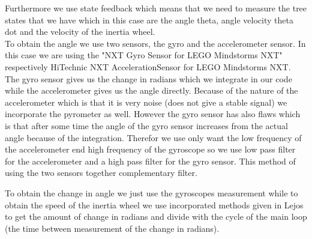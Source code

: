 \documentclass[a4paper]{article}
\begin{document}
Furthermore we use state feedback which means that we need to measure the tree states that we have which in this case are the angle theta, angle velocity theta dot and the velocity of the inertia wheel. \\To obtain the angle we use two sensors, the gyro and the accelerometer sensor. In this case we are using the "NXT Gyro Sensor for LEGO Mindstorms NXT" respectively HiTechnic NXT AccelerationSensor for LEGO Mindstorms NXT. The gyro sensor gives us the change in radians which we integrate in our code while the accelerometer gives us the angle directly. Because of the nature of the accelerometer which is that it is very noise (does not give a stable signal) we incorporate the pyrometer as well. However the gyro sensor has also flaws which is that after some time the angle of the gyro sensor increases from the actual angle because of the integration. Therefor we use only want the low frequency of the accelerometer end high frequency of the gyroscope so we use low pass filter for the accelerometer and a high pass filter for the gyro sensor. This method of using the two sensors together complementary filter. 

To obtain the change in angle we just use the gyroscopes measurement while to obtain the speed of the inertia wheel we use incorporated methods given in Lejos to get the amount of change in radians and divide with the cycle of the main loop (the time between measurement of the change in radians). 
\end{document}
